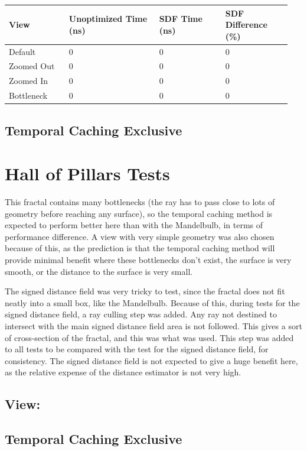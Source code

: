 \begin{tabular}{||p{0.2\linewidth}|p{0.3\linewidth}|p{0.225\linewidth}|p{0.225\linewidth}||}
	\hline
	View & Unoptimized Time (ns) & SDF Time (ns) & SDF Difference (\%)\\
	\hline\hline
	Default & 0 & 0 & 0\\
	\hline
	Zoomed Out & 0 & 0 & 0\\
	\hline
	Zoomed In & 0 & 0 & 0\\
	\hline
	Bottleneck & 0 & 0 & 0\\
	\hline
\end{tabular}

\subsection{Temporal Caching Exclusive}

\section{Hall of Pillars Tests}

This fractal contains many bottlenecks (the ray has to pass close to lots of geometry before reaching any surface), so the temporal caching method is expected to perform better here than with the Mandelbulb, in terms of performance difference. A view with very simple geometry was also chosen because of this, as the prediction is that the temporal caching method will provide minimal benefit where these bottlenecks don't exist, the surface is very smooth, or the distance to the surface is very small.\newline

The signed distance field was very tricky to test, since the fractal does not fit neatly into a small box, like the Mandelbulb. Because of this, during tests for the signed distance field, a ray culling step was added. Any ray not destined to intersect with the main signed distance field area is not followed. This gives a sort of cross-section of the fractal, and this was what was used. This step was added to all tests to be compared with the test for the signed distance field, for consistency. The signed distance field is not expected to give a huge benefit here, as the relative expense of the distance estimator is not very high.

\subsection{View:}

\subsection{Temporal Caching Exclusive}
